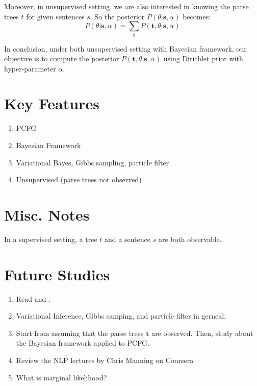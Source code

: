 \documentclass[11pt]{article}
\begin{document}
Moreover, in unsupervised setting, we are also interested in knowing the parse trees $t$ for given sentences $s$. So the posterior $P(\theta|\boldsymbol{s}, \alpha)$ becomes:
$$
P(\theta|\boldsymbol{s}, \alpha) = \sum_{\boldsymbol{t}} P(\boldsymbol{t}, \theta | \boldsymbol{s}, \alpha) 
$$

In conclusion, under both unsupervised setting with Bayesian framework, our objective is to compute the posterior $P(\boldsymbol{t}, \theta | \boldsymbol{s}, \alpha)$ using Dirichlet prior with hyper-parameter $\alpha$.

\section{Key Features}
\begin{enumerate}
 \item PCFG
 \item Bayesian Framework
 \item Variational Bayes, Gibbs sampling, particle filter
 \item Unsupervised (parse trees not observed)
\end{enumerate}

\section{Misc. Notes}
In a supervised setting, a tree $t$ and a sentence $s$ are both observable.

\section{Future Studies}
\begin{enumerate}
 \item Read \cite{beal2003variational} and \cite{kurihara2004application}.
 \item Variational Inference, Gibbs samping, and particle filter in gerneal.
 \item Start from assuming that the parse trees $\boldsymbol{t}$ are observed. Then, study about the Bayesian framework applied to PCFG.
 \item Review the NLP lectures by Chris Manning on Coursera
 \item What is marginal likelihood?
\end{enumerate}






\end{document}
